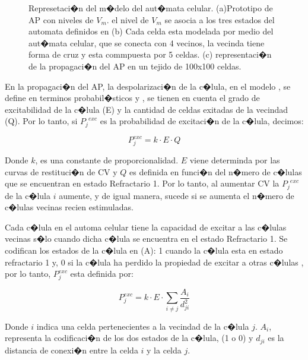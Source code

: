   \begin{figure}
\centering
\caption{Represetaci�n del m�delo del aut�mata celular. (a)Prototipo de \ac{AP}
con niveles de $V_m$. el nivel de $V_m$ se asocia a los tres estados del
automata definidos en \cite{Alonso-Atienza05} (b) Cada celda esta modelada por
medio del aut�mata celular, que se conecta con 4 vecinos, la vecinda  tiene 
forma de cruz  y esta commpuesta por 5 celdas. (c) representaci�n de la propagaci�n 
del \ac{AP} en un tejido de 100x100 celdas.}
  \label{fig:automata1}
\end{figure}

En la propagaci�n del \ac{AP}, la despolarizaci�n de la c�lula, en el modelo
\cite{Alonso-Atienza05}, se define en terminos probabil�sticos y , se tienen en
cuenta el grado de excitabilidad de la c�lula (E) y la cantidad de celdas
exitadas de la vecindad (Q). Por lo tanto, si ${P_{j}}^{exc}$ es la
probabilidad de excitaci�n de la c�lula, decimos:

\begin{equation}\label{eq:Propaga}
P_j^{exc}= k\cdot E\cdot Q
\end{equation}

Donde $k$, es una constante de proporcionalidad. $E$ viene determinda por las
curvas de restituci�n de \ac{CV} y $Q$ es definida en funci�n del n�mero de
c�lulas que se encuentran en estado Refractario 1. Por lo tanto, al aumentar
\ac{CV} la ${P_{j}}^{exc}$ de la c�lula $i$ aumente, y de igual manera, sucede
si se aumenta el n�mero de c�lulas vecinas recien estimuladas.

Cada c�lula en el automa celular tiene la capacidad de excitar a las
c�lulas vecinas s�lo cuando dicha c�lula se encuentra en el estado
Refractario 1. Se codifican los estados de la c�lula en (A):
1 cuando la c�lula esta en estado refractario 1 y, 0 si la
c�lula ha perdido la propiedad de excitar a otras c�lulas
\cite{Alonso-Atienza05}, por lo tanto, $P_j^{exc}$ esta definida por:


\begin{equation}\label{eq:Propaga2}
P_j^{exc}= k \cdot E\cdot\sum_{i \neq j}\frac{A_i}{d_{ji}^2}
\end{equation}

Donde $i$ indica una celda pertenecientes a la vecindad de la c�lula $j$. $A_i$,
representa la codificaci�n de los dos estados de la c�lula, (1 o 0) y $d_{ji}$ 
es la distancia de conexi�n entre la celda $i$ y la celda $j$.


